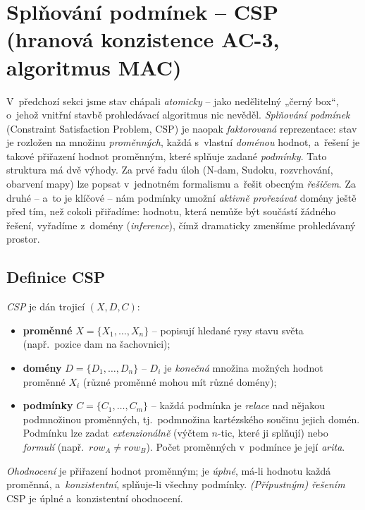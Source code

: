 \section{Splňování podmínek -- CSP (hranová konzistence AC-3, algoritmus MAC)}

V~předchozí sekci jsme stav chápali \emph{atomicky} -- jako nedělitelný „černý box``, o~jehož vnitřní stavbě prohledávací algoritmus nic nevěděl. \emph{Splňování podmínek} (Constraint Satisfaction Problem, CSP) je naopak \emph{faktorovaná} reprezentace: stav je rozložen na množinu \emph{proměnných}, každá s~vlastní \emph{doménou} hodnot, a~řešení je takové přiřazení hodnot proměnným, které splňuje zadané \emph{podmínky}. Tato struktura má dvě výhody. Za prvé řadu úloh (N-dam, Sudoku, rozvrhování, obarvení mapy) lze popsat v~jednotném formalismu a~řešit obecným \emph{řešičem}. Za druhé -- a~to je klíčové -- nám podmínky umožní \emph{aktivně prořezávat} domény ještě před tím, než cokoli přiřadíme: hodnotu, která nemůže být součástí žádného řešení, vyřadíme z~domény (\emph{inference}), čímž dramaticky zmenšíme prohledávaný prostor.

\subsection{Definice CSP}

\begin{definice}
\emph{CSP} je dán trojicí $(X, D, C)$:
\begin{itemize}
  \item \textbf{proměnné} $X = \{X_1,\dots,X_n\}$ -- popisují hledané rysy stavu světa (např.\ pozice dam na šachovnici);
  \item \textbf{domény} $D = \{D_1,\dots,D_n\}$ -- $D_i$ je \emph{konečná} množina možných hodnot proměnné $X_i$ (různé proměnné mohou mít různé domény);
  \item \textbf{podmínky} $C = \{C_1,\dots,C_m\}$ -- každá podmínka je \emph{relace} nad nějakou podmnožinou proměnných, tj.\ podmnožina kartézského součinu jejich domén. Podmínku lze zadat \emph{extenzionálně} (výčtem $n$-tic, které ji splňují) nebo \emph{formulí} (např.\ $\mathit{row}_A \neq \mathit{row}_B$). Počet proměnných v~podmínce je její \emph{arita}.
\end{itemize}
\emph{Ohodnocení} je přiřazení hodnot proměnným; je \emph{úplné}, má-li hodnotu každá proměnná, a~\emph{konzistentní}, splňuje-li všechny podmínky. \emph{(Přípustným) řešením} CSP je úplné a~konzistentní ohodnocení.
\end{definice}

